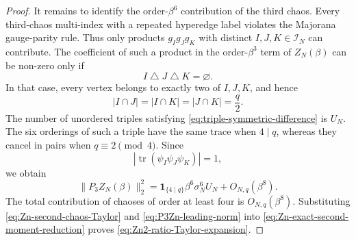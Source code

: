 \documentclass[11pt]{article}
\newcommand{\calI}{\mathcal{I}}
\newcommand{\ind}{\mathbf{1}}
\newcommand{\norm}[1]{\lVert #1\rVert}
\DeclareMathOperator{\tr}{tr}
\begin{document}
\begin{proof}
  It remains to identify the order-$\beta^6$ contribution of the third chaos.
  Every third-chaos multi-index with a repeated hyperedge label violates the
  Majorana gauge-parity rule.  Thus only products $g_Ig_Jg_K$ with distinct
  $I,J,K\in\calI_N$ can contribute.  The coefficient of such a product in
  the order-$\beta^3$ term of $Z_N(\beta)$ can be non-zero only if
  \begin{equation}\label{eq:triple-symmetric-difference}
    I\mathbin{\triangle}J\mathbin{\triangle}K=\varnothing.
  \end{equation}
  In that case, every vertex belongs to exactly two of $I,J,K$, and hence
  \begin{equation}\label{eq:triple-intersections}
    |I\cap J|
    =
    |I\cap K|
    =
    |J\cap K|
    =
    \frac q2.
  \end{equation}
  The number of unordered triples satisfying
  \eqref{eq:triple-symmetric-difference} is $U_N$.  The six orderings of such
  a triple have the same trace when $4\mid q$, whereas they cancel in pairs
  when $q\equiv2\pmod4$.  Since
  \begin{equation}\label{eq:triple-trace-magnitude}
    \left|
      \tr(\psi_I\psi_J\psi_K)
    \right|
    =
    1,
  \end{equation}
  we obtain
  \begin{equation}\label{eq:P3Zn-leading-norm}
    \norm{P_3Z_N(\beta)}_2^2
    =
    \ind_{\{4\mid q\}}
    \beta^6\sigma_N^6U_N
    +
    O_{N,q}(\beta^8).
  \end{equation}
  The total contribution of chaoses of order at least four is
  $O_{N,q}(\beta^8)$.  Substituting
  \eqref{eq:Zn-second-chaos-Taylor} and
  \eqref{eq:P3Zn-leading-norm} into
  \eqref{eq:Zn-exact-second-moment-reduction} proves
  \eqref{eq:Zn2-ratio-Taylor-expansion}.
\end{proof}
\end{document}
